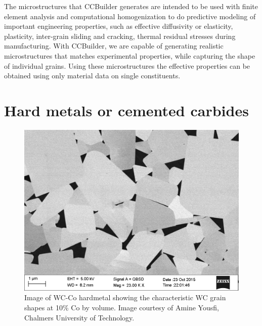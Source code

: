 \documentclass[3p,12pt]{elsarticle}
\begin{document}

The microstructures that CCBuilder generates are intended to be used with finite element analysis and computational homogenization to do predictive modeling of important engineering properties, such as effective diffusivity or elasticity, plasticity, inter-grain sliding and cracking, thermal residual stresses during manufacturing.
With CCBuilder, we are capable of generating realistic microstructures that matches experimental properties, while capturing the shape of individual grains.
Using these microstructures the effective properties can be obtained using only material data on single constituents.


\section{Hard metals or cemented carbides}

\begin{figure}[htbp!]
\centering
\includegraphics[width=0.5\linewidth]{wc_co_example}
\caption{Image of WC-Co hardmetal showing the characteristic WC grain shapes at 10\% Co by volume. Image courtesy of Amine Yousfi, Chalmers University of Technology.} \label{fig:wc-co_hardmetal}
\end{figure}
\end{document}
